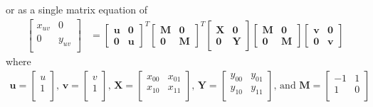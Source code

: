 \documentclass[12pt]{report}
\begin{document}
or as a single matrix equation of 
\begin{equation*}
\begin{split}
\begin{bmatrix}x_{uv} & 0 \\ 0 & y_{uv}\\\end{bmatrix}
&=
\begin{bmatrix}\mathbf{u} & \mathbf{0} \\ \mathbf{0} & \mathbf{u} \end{bmatrix}^{T}
\begin{bmatrix}\mathbf{M} & \mathbf{0} \\ \mathbf{0} & \mathbf{M} \end{bmatrix}^{T}
\begin{bmatrix}\mathbf{X} & \mathbf{0} \\ \mathbf{0} & \mathbf{Y} \end{bmatrix}
\begin{bmatrix}\mathbf{M} & \mathbf{0} \\ \mathbf{0} & \mathbf{M} \end{bmatrix}
\begin{bmatrix}\mathbf{v} & \mathbf{0} \\ \mathbf{0} & \mathbf{v} \end{bmatrix}
\end{split}
\end{equation*}
where
\begin{equation*}
\begin{split}
%
\mathbf{u} =\begin{bmatrix}u \\ 1\\\end{bmatrix}
\text{, }
%
\mathbf{v} =\begin{bmatrix}v \\ 1\\\end{bmatrix}
\text{, }
%
\mathbf{X} =\begin{bmatrix}x_{00} & x_{01} \\ x_{10} & x_{11}\\\end{bmatrix}
\text{, }
%
\mathbf{Y} =\begin{bmatrix}y_{00} & y_{01} \\ y_{10} & y_{11}\\\end{bmatrix}
\text{, and }
%
\mathbf{M} =\begin{bmatrix}-1 & 1 \\ 1 & 0\\\end{bmatrix}
\end{split}
\end{equation*}
\end{document}
